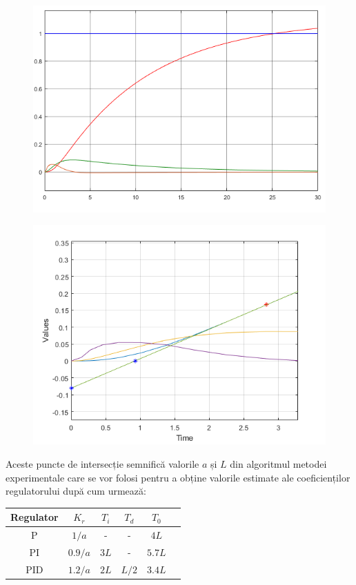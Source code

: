 \documentclass[11pt]{article}
\begin{document}
\begin{figure}[H]
	\centering
	\begin{minipage}{.5\textwidth}
		\centering
		\includegraphics[width=.9\linewidth]{zn_pr.png}
		\label{fig:test1}
	\end{minipage}%
	\begin{minipage}{.6\textwidth}
		\centering
		\includegraphics[width=.9\linewidth]{zn_pct.png}
		\label{fig:test2}
	\end{minipage}
\end{figure}
Aceste puncte de intersecție semnifică valorile $a$ și $L$ din algoritmul metodei experimentale care se vor folosi pentru a obține valorile estimate ale coeficienților regulatorului după cum urmează: 
\newpage
\begin{center}
	\begin{tabular}{|c|c|c|c|c|c|}
		\hline
		Regulator&$K_{r}$&$T_i$&$T_d$&$T_0$\\
		\hline
		P&$1/a$&-&-&$4L$\\
		\hline
		PI&$0.9/a$&$3L$&-&$5.7L$\\
		\hline
		PID&$1.2/a$&$2L$&$L/2$&$3.4L$\\
		\hline
	\end{tabular}
\end{center}
\end{document}
